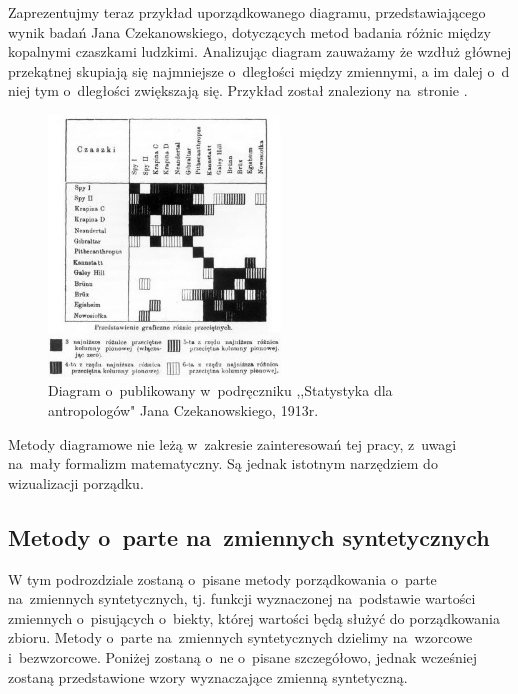 \documentclass[12pt,a4paper]{report}
\begin{document}

Zaprezentujmy teraz przykład uporządkowanego diagramu, przedstawiającego wynik badań Jana Czekanowskiego, dotyczących metod badania różnic między kopalnymi czaszkami ludzkimi. Analizując diagram zauważamy że wzdłuż głównej przekątnej skupiają się najmniejsze o~dległości między zmiennymi, a im dalej o~d niej tym o~dległości zwiększają się. Przykład został znaleziony na~stronie \cite{czekanowski}. 
\begin{figure}[h]
\centering
\includegraphics[width=0.55\textwidth]{img/diagram_maczek.jpg}
\caption{Diagram o~publikowany w~podręczniku ,,Statystyka dla antropologów" Jana Czekanowskiego, 1913r. \cite{czekanowski}}
\label{fig:obrazek1}
\end{figure}

Metody diagramowe nie leżą w~zakresie zainteresowań tej pracy, z~uwagi na~mały formalizm matematyczny. Są jednak istotnym narzędziem do wizualizacji porządku. 




\subsection{Metody o~parte na~zmiennych syntetycznych}

W tym podrozdziale zostaną o~pisane metody porządkowania o~parte na~zmiennych syntetycznych, tj. funkcji wyznaczonej na~podstawie wartości zmiennych o~pisujących o~biekty, której wartości będą służyć do porządkowania zbioru. Metody o~parte na~zmiennych syntetycznych dzielimy na~wzorcowe i~bezwzorcowe. Poniżej zostaną o~ne o~pisane szczegółowo, jednak wcześniej zostaną przedstawione wzory wyznaczające zmienną syntetyczną. 
\end{document}
